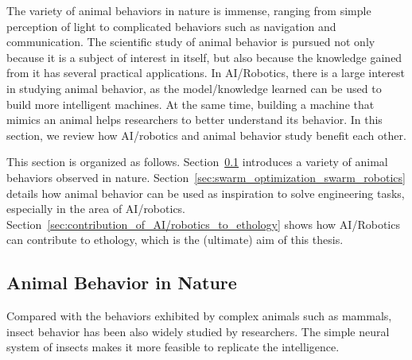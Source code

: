 The variety of animal behaviors in nature is immense, ranging from simple perception of light to complicated behaviors such as navigation and communication. The scientific study of animal behavior is pursued not only because it is a subject of interest in itself, but also because the knowledge gained from it has several practical applications. In AI/Robotics, there is a large interest in studying animal behavior, as the model/knowledge learned can be used to build more intelligent machines. At the same time, building a machine that mimics an animal helps researchers to better understand its behavior. In this section, we review how AI/robotics and animal behavior study benefit each other. 

This section is organized as follows. Section~\ref{sec:animal_behavior_in_nature} introduces a variety of animal behaviors observed in nature. Section~\ref{sec:swarm_optimization_swarm_robotics} details how animal behavior can be used as inspiration to solve engineering tasks, especially in the area of AI/robotics. Section~\ref{sec:contribution_of_AI/robotics_to_ethology} shows how AI/Robotics can contribute to ethology, which is the (ultimate) aim of this thesis.

\subsection{Animal Behavior in Nature}\label{sec:animal_behavior_in_nature}

Compared with the behaviors exhibited by complex animals such as mammals, insect behavior has been also widely studied by researchers. The simple neural system of insects makes it more feasible to replicate the intelligence. 


